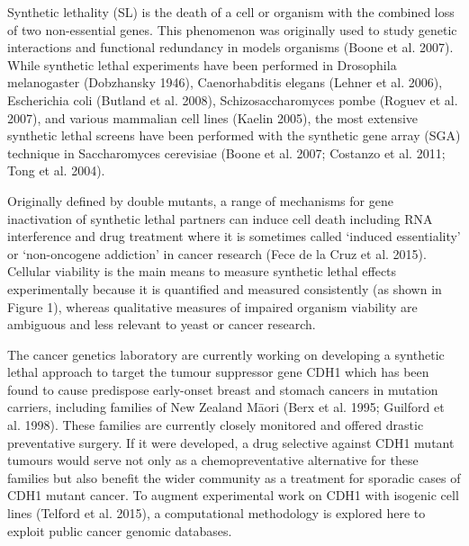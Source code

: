 Synthetic lethality (SL) is the death of a cell or organism with the combined loss of two non-essential genes.   This phenomenon was originally used to study genetic interactions and functional redundancy in models organisms (Boone et al. 2007).   While synthetic lethal experiments have been performed in Drosophila melanogaster (Dobzhansky 1946), Caenorhabditis elegans (Lehner et al. 2006), Escherichia coli (Butland et al. 2008), Schizosaccharomyces pombe (Roguev et al. 2007), and various mammalian cell lines (Kaelin 2005), the most extensive synthetic lethal screens have been performed with the synthetic gene array (SGA) technique in Saccharomyces cerevisiae (Boone et al. 2007; Costanzo et al. 2011; Tong et al. 2004).  

Originally defined by double mutants, a range of mechanisms for gene inactivation of synthetic lethal partners can induce cell death including RNA interference and drug treatment where it is sometimes called ‘induced essentiality’ or ‘non-oncogene addiction’ in cancer research (Fece de la Cruz et al. 2015).  Cellular viability is the main means to measure synthetic lethal effects experimentally because it is quantified and measured consistently (as shown in Figure 1), whereas qualitative measures of impaired organism viability are ambiguous and less relevant to yeast or cancer research.

The cancer genetics laboratory are currently working on developing a synthetic lethal approach to target the tumour suppressor gene CDH1 which has been found to cause predispose early-onset breast and stomach cancers in mutation carriers, including families of New Zealand M\={a}ori (Berx et al. 1995; Guilford et al. 1998).  These families are currently closely monitored and offered drastic preventative surgery.  If it were developed, a drug selective against CDH1 mutant tumours would serve not only as a chemopreventative alternative for these families but also benefit the wider community as a treatment for sporadic cases of CDH1 mutant cancer.  To augment experimental work on CDH1 with isogenic cell lines (Telford et al. 2015), a computational methodology is explored here to exploit public cancer genomic databases.

